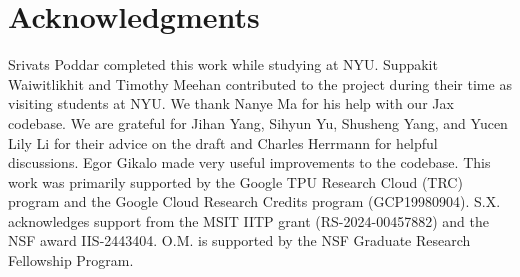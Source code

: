 \section{Acknowledgments}
Srivats Poddar completed this work while studying at NYU. Suppakit Waiwitlikhit and Timothy Meehan contributed to the project during their time as visiting students at NYU. We thank Nanye Ma for his help with our Jax codebase. We are grateful for Jihan Yang, Sihyun Yu, Shusheng Yang, and Yucen Lily Li for their advice on the draft and Charles Herrmann for helpful discussions. Egor Gikalo made very useful improvements to the \solarisengine codebase. This work was primarily supported by the Google TPU Research Cloud (TRC) program and the Google Cloud Research Credits program (GCP19980904). S.X. acknowledges support from the MSIT IITP grant (RS-2024-00457882) and the NSF award IIS-2443404. O.M. is supported by the NSF Graduate Research Fellowship Program. 
\newpage
